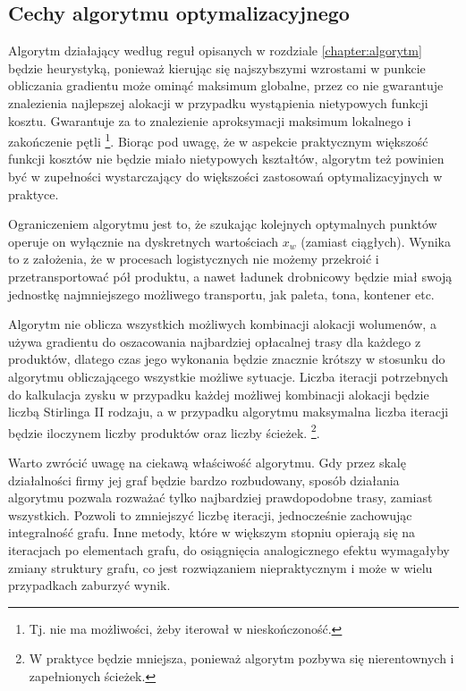 \documentclass[polish, twoside, 12pt, a4paper]{article}
\theoremstyle{definition}
\theoremstyle{plain}
\theoremstyle{remark}
\begin{document}
\subsection{Cechy algorytmu optymalizacyjnego} \label{chapter:cechy}

Algorytm działający według reguł opisanych w rozdziale \ref{chapter:algorytm} będzie heurystyką, ponieważ kierując się najszybszymi wzrostami w punkcie obliczania gradientu może ominąć maksimum globalne, przez co nie gwarantuje znalezienia najlepszej alokacji w przypadku wystąpienia nietypowych funkcji kosztu. Gwarantuje za to znalezienie aproksymacji maksimum lokalnego i zakończenie pętli \footnote{Tj. nie ma możliwości, żeby iterował w nieskończoność.}. Biorąc pod uwagę, że w aspekcie praktycznym większość funkcji kosztów nie będzie miało nietypowych kształtów, algorytm też powinien być w zupełności wystarczający do większości zastosowań optymalizacyjnych w praktyce.

Ograniczeniem algorytmu jest to, że szukając kolejnych optymalnych punktów operuje on wyłącznie na dyskretnych wartościach $x_w$ (zamiast ciągłych). Wynika to z założenia, że w procesach logistycznych nie możemy przekroić i przetransportować pół produktu, a nawet ładunek drobnicowy będzie miał swoją jednostkę najmniejszego możliwego transportu, jak paleta, tona, kontener etc. 

Algorytm nie oblicza wszystkich możliwych kombinacji alokacji wolumenów, a używa gradientu do oszacowania najbardziej opłacalnej trasy dla każdego z produktów, dlatego czas jego wykonania będzie znacznie krótszy w stosunku do algorytmu obliczającego wszystkie możliwe sytuacje. Liczba iteracji potrzebnych do kalkulacja zysku w przypadku każdej możliwej kombinacji alokacji będzie liczbą Stirlinga II rodzaju, a w przypadku algorytmu maksymalna liczba iteracji będzie iloczynem liczby produktów oraz liczby ścieżek. \footnote{W praktyce będzie mniejsza, ponieważ algorytm pozbywa się nierentownych i zapełnionych ścieżek.}. 

Warto zwrócić uwagę na ciekawą właściwość algorytmu. Gdy przez skalę działalności firmy jej graf będzie bardzo rozbudowany, sposób działania algorytmu pozwala rozważać tylko najbardziej prawdopodobne trasy, zamiast wszystkich. Pozwoli to zmniejszyć liczbę iteracji, jednocześnie zachowując integralność grafu. Inne metody, które w większym stopniu opierają się na iteracjach po elementach grafu, do osiągnięcia analogicznego efektu wymagałyby zmiany struktury grafu, co jest rozwiązaniem niepraktycznym i może w wielu przypadkach zaburzyć wynik. 
\end{document}
